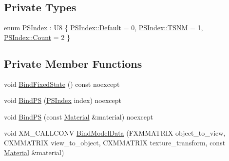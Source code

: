 \subsection*{Private Types}
\begin{DoxyCompactItemize}
\item 
enum \hyperlink{classmage_1_1_g_buffer_pass_a23039b6695c10c88676c38fe63123571}{P\+S\+Index} \+: U8 \{ \hyperlink{classmage_1_1_g_buffer_pass_a23039b6695c10c88676c38fe63123571a7a1920d61156abc05a60135aefe8bc67}{P\+S\+Index\+::\+Default} = 0, 
\hyperlink{classmage_1_1_g_buffer_pass_a23039b6695c10c88676c38fe63123571a6e02c9f63944ea221e7d55c11ecae07b}{P\+S\+Index\+::\+T\+S\+NM} = 1, 
\hyperlink{classmage_1_1_g_buffer_pass_a23039b6695c10c88676c38fe63123571ae93f994f01c537c4e2f7d8528c3eb5e9}{P\+S\+Index\+::\+Count} = 2
 \}
\end{DoxyCompactItemize}
\subsection*{Private Member Functions}
\begin{DoxyCompactItemize}
\item 
void \hyperlink{classmage_1_1_g_buffer_pass_a40c47c900474fc47af02020ac5b04d27}{Bind\+Fixed\+State} () const noexcept
\item 
void \hyperlink{classmage_1_1_g_buffer_pass_a750c27aa6f562b53d62f845ce50e731d}{Bind\+PS} (\hyperlink{classmage_1_1_g_buffer_pass_a23039b6695c10c88676c38fe63123571}{P\+S\+Index} index) noexcept
\item 
void \hyperlink{classmage_1_1_g_buffer_pass_afe16e10cc6d3c7d56d387eb1fe2a66ee}{Bind\+PS} (const \hyperlink{classmage_1_1_material}{Material} \&material) noexcept
\item 
void X\+M\+\_\+\+C\+A\+L\+L\+C\+O\+NV \hyperlink{classmage_1_1_g_buffer_pass_a96175e27751c286737d327a4f26f01dd}{Bind\+Model\+Data} (F\+X\+M\+M\+A\+T\+R\+IX object\+\_\+to\+\_\+view, C\+X\+M\+M\+A\+T\+R\+IX view\+\_\+to\+\_\+object, C\+X\+M\+M\+A\+T\+R\+IX texture\+\_\+transform, const \hyperlink{classmage_1_1_material}{Material} \&material)
\end{DoxyCompactItemize}
